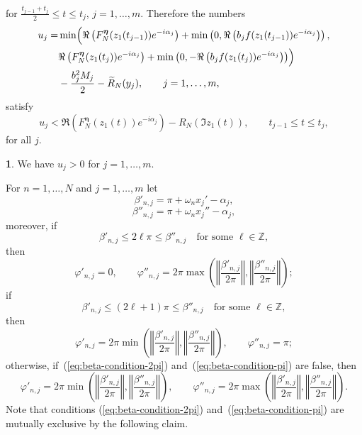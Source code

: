 \documentclass[oneside,english]{amsart}
\numberwithin{equation}{section}
\numberwithin{figure}{section}
\theoremstyle{plain}
\theoremstyle{plain}
\theoremstyle{plain}
\theoremstyle{definition}
\newtheorem{claim}{\protect\claimname}
\providecommand{\claimname}{Claim}
\begin{document}
for $\frac{t_{j-1}+t_{j}}{2}\leq t\leq t_{j}$, $j=1,\dotsc,m$. Therefore
the numbers
\begin{align*}
u_{j}= & \min\Bigl(\Re\left(F_{N}^{\boldsymbol{\eta}}(z_{1}(t_{j-1}))e^{-i\alpha_{j}}\right)+\min\left(0,\Re\left(b_{j}f(z_{1}(t_{j-1}))e^{-i\alpha_{j}}\right)\right),\\
 & \Re\left(F_{N}^{\boldsymbol{\eta}}(z_{1}(t_{j}))e^{-i\alpha_{j}}\right)+\min\left(0,-\Re\left(b_{j}f(z_{1}(t_{j}))e^{-i\alpha_{j}}\right)\right)\Bigr)\\
 & -\frac{b_{j}^{2}M_{j}}{2}-\widetilde{R}_{N}(y_{j}),\qquad j=1,\dotsc,m,
\end{align*}
satisfy
\[
u_{j}<\Re\left(F_{N}^{\boldsymbol{\eta}}(z_{1}(t))e^{-i\alpha_{j}}\right)-R_{N}(\Im z_{1}(t)),\qquad t_{j-1}\leq t\leq t_{j},
\]
for all $j$.

\begin{claim}
We have $u_{j}>0$ for $j=1,\dotsc,m$.
\end{claim}
For $n=1,\dotsc,N$ and $j=1,\dotsc,m$ let
\[
\beta'_{n,j}=\pi+\omega_{n}x_{j}'-\alpha_{j},
\]
\[
\beta''_{n,j}=\pi+\omega_{n}x_{j}''-\alpha_{j},
\]
moreover, if
\begin{equation}
\beta'_{n,j}\leq2\ell\pi\leq\beta''_{n,j}\hspace{1em}\text{for some }\ell\in\mathbb{Z},\label{eq:beta-condition-2pi}
\end{equation}
then
\[
\varphi'_{n,j}=0,\qquad\varphi''_{n,j}=2\pi\max\left(\left\Vert \frac{\beta'_{n,j}}{2\pi}\right\Vert ,\left\Vert \frac{\beta''_{n,j}}{2\pi}\right\Vert \right);
\]
if
\begin{equation}
\beta'_{n,j}\leq(2\ell+1)\pi\leq\beta''_{n,j}\hspace{1em}\text{for some }\ell\in\mathbb{Z},\label{eq:beta-condition-pi}
\end{equation}
then
\[
\varphi'_{n,j}=2\pi\min\left(\left\Vert \frac{\beta'_{n,j}}{2\pi}\right\Vert ,\left\Vert \frac{\beta''_{n,j}}{2\pi}\right\Vert \right),\qquad\varphi''_{n,j}=\pi;
\]
otherwise, if~(\ref{eq:beta-condition-2pi}) and~(\ref{eq:beta-condition-pi})
are false, then
\[
\varphi'_{n,j}=2\pi\min\left(\left\Vert \frac{\beta'_{n,j}}{2\pi}\right\Vert ,\left\Vert \frac{\beta''_{n,j}}{2\pi}\right\Vert \right),\qquad\varphi''_{n,j}=2\pi\max\left(\left\Vert \frac{\beta'_{n,j}}{2\pi}\right\Vert ,\left\Vert \frac{\beta''_{n,j}}{2\pi}\right\Vert \right).
\]
Note that conditions (\ref{eq:beta-condition-2pi}) and~(\ref{eq:beta-condition-pi})
are mutually exclusive by the following claim.
\end{document}
